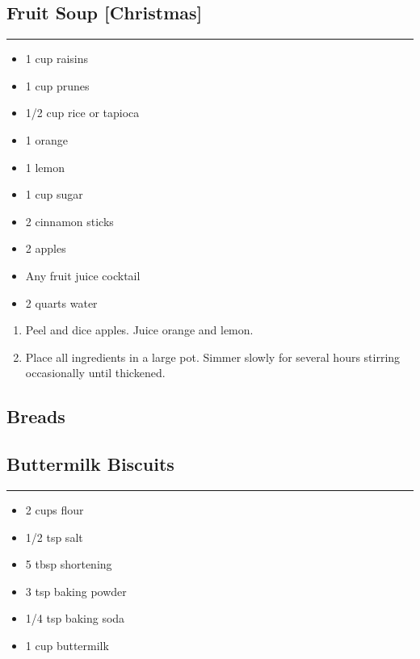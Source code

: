 \documentclass{article}
\begin{document}
\subsection{Fruit Soup [Christmas]} 
\noindent\rule[0.5ex]{\linewidth}{1pt}

\begin{framed}
    \begin{itemize}
        \item 1 cup raisins 
        \item 1 cup prunes 
        \item 1/2 cup rice or tapioca 
        \item 1 orange 
        \item 1 lemon 
        \item 1 cup sugar 
        \item 2 cinnamon sticks 
        \item 2 apples
        \item Any fruit juice cocktail 
        \item 2 quarts water 
    \end{itemize}
\end{framed}

\begin{enumerate}
    \item 
        Peel and dice apples. Juice orange and lemon.
    \item 
        Place all ingredients in a large pot. Simmer slowly for several hours stirring occasionally until thickened.
\end{enumerate}
\newpage

\vspace*{\fill}
\begin{center}
    \section{Breads}
\end{center}
\vspace*{\fill}
\newpage

\subsection{Buttermilk Biscuits} 
\noindent\rule[0.5ex]{\linewidth}{1pt}

\begin{framed}
\begin{itemize}
    \item 2 cups flour
    \item 1/2 tsp salt
    \item 5 tbsp shortening
    \item 3 tsp baking powder
    \item 1/4 tsp baking soda
    \item 1 cup buttermilk
\end{itemize}
\end{framed}
\end{document}

